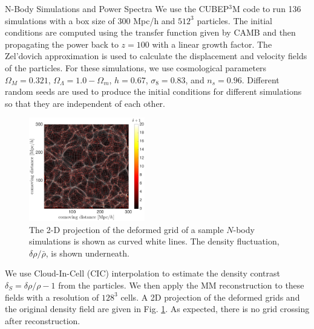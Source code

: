 \begin{section}{N-Body Simulations and Power Spectra}
  \label{sec:simulation}
  We use the \textsc{CUBEP$^3$M} code \cite{bib:Harnois2013} to run
  136 simulations with a box size of 300 Mpc/h and $512^3$ particles.
  The initial conditions are computed using the transfer function
  given by CAMB \cite{bib:Lewis2000} and then propagating the power
  back to $z=100$ with a linear growth factor.  The Zel'dovich
  approximation is used to calculate the displacement and velocity
  fields of the particles.  For these simulations, we use cosmological
  parameters $\Omega_M=0.321$, $\Omega_{\Lambda}=1.0-\Omega_m$,
  $h=0.67$, $\sigma_8=0.83$, and $n_s=0.96$.  Different random seeds
  are used to produce the initial conditions for different simulations
  so that they are independent of each other.

  \begin{figure}[h]
    \centering
    \includegraphics[width=0.45\textwidth]{fig1.pdf}
    \caption{ The 2-D projection of the deformed grid of a sample
      $N$-body simulations is shown as curved white lines.  The
      density fluctuation, $\delta\rho/\bar{\rho}$, is shown
      underneath.}
    \label{fig:simandrec}
 \end{figure}

  We use Cloud-In-Cell (CIC) interpolation to estimate the density
  contrast $\delta_S=\delta\rho/\rho-1$ from the particles.  We then
  apply the MM reconstruction to these fields with a resolution of
  $128^3$ cells.  A 2D projection of the deformed grids and the
  original density field are given in Fig. \ref{fig:simandrec}.  As
  expected, there is no grid crossing after reconstruction.
 

\end{section}
